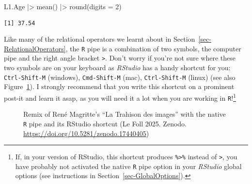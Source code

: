 \documentclass[
  letterpaper,
  DIV=11,
  numbers=noendperiod]{scrreprt}
\newenvironment{Shaded}{\begin{snugshade}}{\end{snugshade}}
\newcommand{\AttributeTok}[1]{\textcolor[rgb]{0.40,0.45,0.13}{#1}}
\newcommand{\DecValTok}[1]{\textcolor[rgb]{0.68,0.00,0.00}{#1}}
\newcommand{\FunctionTok}[1]{\textcolor[rgb]{0.28,0.35,0.67}{#1}}
\newcommand{\NormalTok}[1]{\textcolor[rgb]{0.00,0.23,0.31}{#1}}
\newcommand{\SpecialCharTok}[1]{\textcolor[rgb]{0.37,0.37,0.37}{#1}}
\begin{document}
\begin{Shaded}
\begin{Highlighting}[]
\NormalTok{L1.Age }\SpecialCharTok{|\textgreater{}} 
 \FunctionTok{mean}\NormalTok{() }\SpecialCharTok{|\textgreater{}} 
 \FunctionTok{round}\NormalTok{(}\AttributeTok{digits =} \DecValTok{2}\NormalTok{)}
\end{Highlighting}
\end{Shaded}

\begin{verbatim}
[1] 37.54
\end{verbatim}

Like many of the relational operators we learnt about in
Section~\ref{sec-RelationalOperators}, the \texttt{R} pipe is a
combination of two symbols, the computer pipe \texttt{\textbar{}} and
the right angle bracket \texttt{\textgreater{}}. Don't worry if you're
not sure where these two symbols are on your keyboard as \emph{RStudio}
has a handy shortcut for you:
\texttt{Ctrl-Shift-M} (windows), \texttt{Cmd-Shift-M} (mac), \texttt{Ctrl-Shift-M} (linux)
(see also Figure~\ref{fig-Pipes}). I strongly recommend that you write
this shortcut on a prominent post-it and learn it asap, as you will need
it a lot when you are working in \texttt{R}!\footnote{If, in your
  version of RStudio, this shortcut produces \texttt{\%\textgreater{}\%}
  instead of \texttt{\textbar{}\textgreater{}}, you have probably not
  activated the native \texttt{R} pipe option in your \emph{RStudio}
  global options (see instructions in Section~\ref{sec-GlobalOptions}).}

\begin{figure}


\caption{\label{fig-Pipes}Remix of René Magritte's ``La Trahison des
images'' with the native \texttt{R} pipe and its RStudio shortcut (Le
Foll 2025. Zenodo. \url{https://doi.org/10.5281/zenodo.17440405})}

\end{figure}%
\end{document}
